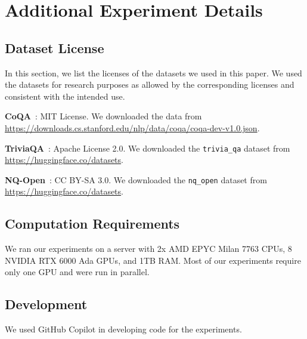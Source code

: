 
\section{Additional Experiment Details}%

\subsection{Dataset License}
In this section, we list the licenses of the datasets we used in this paper.
We used the datasets for research purposes as allowed by the corresponding licenses and consistent with the intended use.


\textbf{CoQA}~\cite{reddy-etal-2019-coqa}: MIT License. 
We downloaded the data from \url{https://downloads.cs.stanford.edu/nlp/data/coqa/coqa-dev-v1.0.json}.

\textbf{TriviaQA}~\cite{joshi-etal-2017-triviaqa}: Apache License 2.0.
We downloaded the \texttt{trivia\_qa} dataset from \url{https://huggingface.co/datasets}.

\textbf{NQ-Open}~\cite{kwiatkowski-etal-2019-natural}: CC BY-SA 3.0.
We downloaded the \texttt{nq\_open} dataset from \url{https://huggingface.co/datasets}.

\subsection{Computation Requirements}
We ran our experiments on a server with 2x AMD EPYC Milan 7763 CPUs, 8 NVIDIA RTX 6000 Ada GPUs, and 1TB RAM. 
Most of our experiments require only one GPU and were run in parallel. 

\subsection{Development}
We used GitHub Copilot in developing code for the experiments.